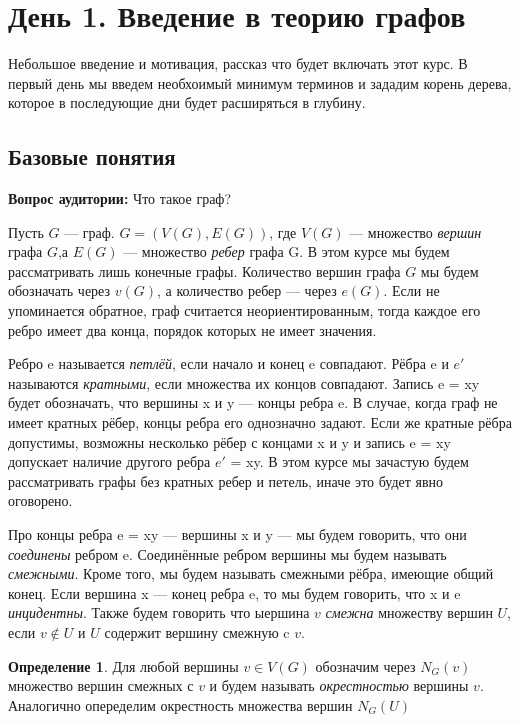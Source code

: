 \documentclass{article}
\theoremstyle{definition}
\newtheorem{definition}{Определение}[section]
\newcommand{\question}{\textbf{Вопрос аудитории: }}
\theoremstyle{remark}
\begin{document}
\tableofcontents

\section{День 1. Введение в теорию графов}

Небольшое введение и мотивация, рассказ что будет включать этот курс. В первый день мы введем необхоимый минимум терминов и зададим корень дерева, которое в последующие дни будет расширяться в глубину.

\subsection{Базовые понятия}
\question Что такое граф?


Пусть $G$ — граф. $G = (V(G), E(G))$, где $V(G)$ — множество \textit{вершин} графа $G$,а  $E(G)$ —
множество \textit{ребер} графа G. В этом курсе мы будем рассматривать лишь конечные графы. Количество вершин графа $G$ мы будем обозначать через $v(G)$, а количество ребер — через $e(G)$.
Если не упоминается обратное, граф считается неориентированным,
тогда каждое его ребро имеет два конца, порядок которых не имеет значения. 


Ребро e называется \textit{петлёй}, если начало и конец e совпадают.
Рёбра e и  $e'$ называются \textit{кратными}, если множества их концов совпадают.
Запись e = xy будет обозначать, что вершины x и y — концы ребра e.
В случае, когда граф не имеет кратных рёбер, концы ребра его однозначно задают. Если же кратные рёбра допустимы, возможны несколько
рёбер с концами x и y и запись e = xy допускает наличие другого ребра $e'$ = xy.
В этом курсе мы зачастую будем рассматривать графы без кратных ребер и петель, иначе это будет явно оговорено. 


Про концы ребра e = xy — вершины x и y — мы будем говорить,
что они \textit{соединены} ребром e. Соединённые ребром вершины мы будем
называть \textit{смежными}. Кроме того, мы будем называть смежными рёбра,
имеющие общий конец. Если вершина x — конец ребра e, то мы будем
говорить, что x и e \textit{инцидентны}. Также будем говорить что ыершина $v$ \textit{смежна} множеству вершин $U$, если $v \notin U$ и $U$ содержит вершину смежную c $v$.

\begin{definition}
Для любой вершины $v \in V(G)$  обозначим через  $N_{G}(v)$ множество вершин смежных с $v$ и будем называть \textit{окрестностью} вершины $v$. Аналогично опеределим окрестность множества вершин $N_{G}(U)$
\end{definition}
\end{document}
